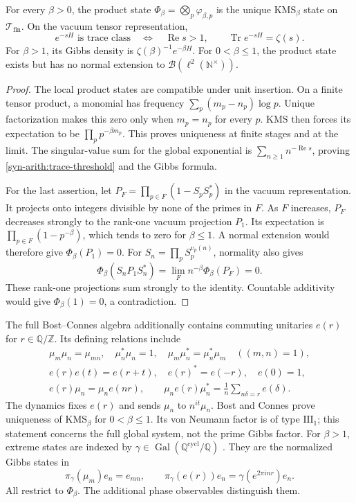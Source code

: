 \begin{theorem}
\label{syn-arith:global-kms}
For every $\beta>0$, the product state
$\Phi_\beta=\bigotimes_p\varphi_{\beta,p}$ is the unique KMS$_\beta$ state
on $\mathcal T_{\mathrm{fin}}$.  On the vacuum tensor representation,
\begin{equation}
 e^{-sH}\text{ is trace class}\quad\Longleftrightarrow\quad
 \operatorname{Re}s>1,
 \qquad \operatorname{Tr}e^{-sH}=\zeta(s).
 \label{syn-arith:trace-threshold}
\end{equation}
For $\beta>1$, its Gibbs density is $\zeta(\beta)^{-1}e^{-\beta H}$.
For $0<\beta\leq1$, the product state exists but has no normal extension
to $\mathcal B(\ell^2(\mathbb N^\times))$.
\end{theorem}
\begin{proof}
The local product states are compatible under unit insertion.
On a finite tensor product, a monomial has frequency
$\sum_p(m_p-n_p)\log p$.  Unique factorization makes this zero only when
$m_p=n_p$ for every $p$.  KMS then forces its expectation to be
$\prod_pp^{-\beta m_p}$.  This proves uniqueness at finite stages and at the limit.
The singular-value sum for the global exponential is
$\sum_{n\geq1}n^{-\operatorname{Re}s}$, proving
\eqref{syn-arith:trace-threshold} and the Gibbs formula.

For the last assertion, let
$P_F=\prod_{p\in F}(1-S_pS_p^*)$ in the vacuum representation.
It projects onto integers divisible by none of the primes in $F$.
As $F$ increases, $P_F$ decreases strongly to the rank-one vacuum projection $P_1$.
Its expectation is $\prod_{p\in F}(1-p^{-\beta})$, which tends to zero
for $\beta\leq1$.  A normal extension would therefore give $\Phi_\beta(P_1)=0$.
For $S_n=\prod_pS_p^{v_p(n)}$, normality also gives
\[
 \Phi_\beta(S_nP_1S_n^*)
 =\lim_F n^{-\beta}\Phi_\beta(P_F)=0.
\]
These rank-one projections sum strongly to the identity.
Countable additivity would give $\Phi_\beta(1)=0$, a contradiction.
\end{proof}

The full Bost--Connes algebra additionally contains commuting unitaries
$e(r)$ for $r\in\mathbb Q/\mathbb Z$.  Its defining relations include
\[
\begin{gathered}
 \mu_m\mu_n=\mu_{mn},\quad \mu_n^*\mu_n=1,\quad
 \mu_m\mu_n^*=\mu_n^*\mu_m\quad((m,n)=1),\\
 e(r)e(t)=e(r+t),\quad e(r)^*=e(-r),\quad e(0)=1,\\
 e(r)\mu_n=\mu_ne(nr),\qquad
 \mu_ne(r)\mu_n^*=\frac1n\sum_{n\delta=r}e(\delta).
\end{gathered}
\]
The dynamics fixes $e(r)$ and sends $\mu_n$ to $n^{it}\mu_n$.
Bost and Connes prove uniqueness of KMS$_\beta$ for $0<\beta\leq1$.
Its von Neumann factor is of type $\mathrm{III}_1$; this statement concerns
the full global system, not the prime Gibbs factor.
For $\beta>1$, extreme states are indexed by
$\gamma\in\operatorname{Gal}(\mathbb Q^{\mathrm{cycl}}/\mathbb Q)$
\cite[Propositions~18, 21, 23--24, Theorem~25, and \S7]{syn-arith:BC}.
They are the normalized Gibbs states in
\[
 \pi_\gamma(\mu_m)e_n=e_{mn},\qquad
 \pi_\gamma(e(r))e_n=\gamma(e^{2\pi inr})e_n.
\]
All restrict to $\Phi_\beta$.  The additional phase observables distinguish them.


